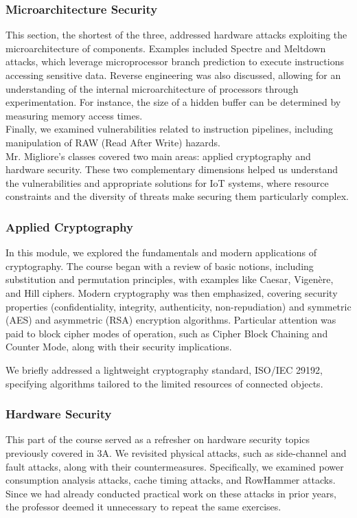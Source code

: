 \subsubsection{Microarchitecture Security}
\indent \indent This section, the shortest of the three, addressed hardware attacks exploiting the microarchitecture of components. Examples included Spectre and Meltdown attacks, which leverage microprocessor branch prediction to execute instructions accessing sensitive data. Reverse engineering was also discussed, allowing for an understanding of the internal microarchitecture of processors through experimentation. For instance, the size of a hidden buffer can be determined by measuring memory access times.\\
\noindent Finally, we examined vulnerabilities related to instruction pipelines, including manipulation of RAW (Read After Write) hazards.
\\

Mr. Migliore's classes covered two main areas: applied cryptography and hardware security. These two complementary dimensions helped us understand the vulnerabilities and appropriate solutions for IoT systems, where resource constraints and the diversity of threats make securing them particularly complex.

\subsubsection{Applied Cryptography}
\indent \indent In this module, we explored the fundamentals and modern applications of cryptography. The course began with a review of basic notions, including substitution and permutation principles, with examples like Caesar, Vigenère, and Hill ciphers. Modern cryptography was then emphasized, covering security properties (confidentiality, integrity, authenticity, non-repudiation) and symmetric (AES) and asymmetric (RSA) encryption algorithms. Particular attention was paid to block cipher modes of operation, such as Cipher Block Chaining and Counter Mode, along with their security implications.

We briefly addressed a lightweight cryptography standard, ISO/IEC 29192, specifying algorithms tailored to the limited resources of connected objects.

\subsubsection{Hardware Security}
\indent \indent This part of the course served as a refresher on hardware security topics previously covered in 3A. We revisited physical attacks, such as side-channel and fault attacks, along with their countermeasures. Specifically, we examined power consumption analysis attacks, cache timing attacks, and RowHammer attacks. Since we had already conducted practical work on these attacks in prior years, the professor deemed it unnecessary to repeat the same exercises.

